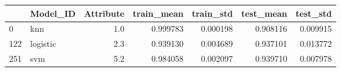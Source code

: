 \begin{tabular}{llrrrrr}
\toprule
{} &  Model\_ID &  Attribute &  train\_mean &  train\_std &  test\_mean &  test\_std \\
\midrule
0   &       knn &        1.0 &    0.999783 &   0.000198 &   0.908116 &  0.009915 \\
122 &  logistic &        2.3 &    0.939130 &   0.004689 &   0.937101 &  0.013772 \\
251 &       svm &        5.2 &    0.984058 &   0.002097 &   0.939710 &  0.007978 \\
\bottomrule
\end{tabular}
